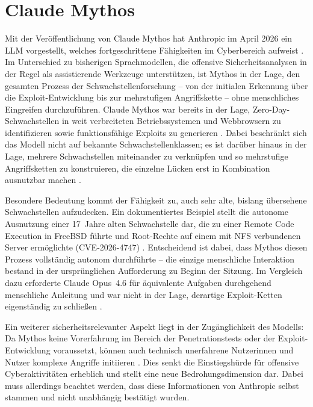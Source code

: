 \section{Claude Mythos}
\label{sec:claude-mythos}

Mit der Veröffentlichung von Claude Mythos hat Anthropic im April 2026
ein LLM vorgestellt, welches fortgeschrittene Fähigkeiten im Cyberbereich aufweist \cite{anthropic_mythos_preview, aisi_claude_mythos_2026}.
Im Unterschied zu bisherigen Sprachmodellen, die offensive
Sicherheitsanalysen in der Regel als assistierende Werkzeuge unterstützen,
ist Mythos in der Lage, den gesamten Prozess der Schwachstellenforschung --
von der initialen Erkennung über die Exploit-Entwicklung bis zur
mehrstufigen Angriffskette -- ohne menschliches Eingreifen durchzuführen.
Claude Mythos war bereits in der Lage, Zero-Day-Schwachstellen in weit
verbreiteten Betriebssystemen und Webbrowsern zu identifizieren sowie
funktionsfähige Exploits zu generieren \cite{anthropic_mythos_preview}.
Dabei beschränkt sich das Modell nicht auf bekannte Schwachstellenklassen;
es ist darüber hinaus in der Lage, mehrere Schwachstellen miteinander zu
verknüpfen und so mehrstufige Angriffsketten zu konstruieren, die einzelne
Lücken erst in Kombination ausnutzbar machen \cite{anthropic_mythos_preview}.

Besondere Bedeutung kommt der Fähigkeit zu, auch sehr alte, bislang
übersehene Schwachstellen aufzudecken. Ein dokumentiertes Beispiel stellt
die autonome Ausnutzung einer 17~Jahre alten Schwachstelle dar, die zu
einer Remote Code Execution in FreeBSD führte und Root-Rechte
auf einem mit NFS verbundenen Server ermöglichte
(CVE-2026-4747) \cite{anthropic_mythos_preview}. Entscheidend ist dabei,
dass Mythos diesen Prozess vollständig autonom durchführte -- die
einzige menschliche Interaktion bestand in der ursprünglichen Aufforderung
zu Beginn der Sitzung. Im Vergleich dazu erforderte Claude Opus~4.6 für
äquivalente Aufgaben durchgehend menschliche Anleitung und war nicht in der
Lage, derartige Exploit-Ketten eigenständig zu schließen
\cite{anthropic_mythos_preview}.

Ein weiterer sicherheitsrelevanter Aspekt liegt in der Zugänglichkeit
des Modells: Da Mythos keine Vorerfahrung im Bereich der Penetrationstests
oder der Exploit-Entwicklung voraussetzt, können auch technisch unerfahrene Nutzerinnen und Nutzer komplexe Angriffe initiieren
\cite{anthropic_mythos_preview, aisi_claude_mythos_2026}. Dies senkt die
Einstiegshürde für offensive Cyberaktivitäten erheblich und stellt
eine neue Bedrohungsdimension dar. Dabei muss allerdings beachtet werden, dass diese Informationen von Anthropic selbst stammen und nicht unabhängig bestätigt wurden. 

